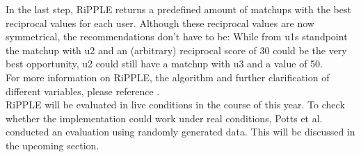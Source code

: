 \documentclass[nochapterpage,bigchapter,linedtoc,longdoc,colorback,accentcolor=tud3b]{tudreport}
\begin{document}
In the last step, RiPPLE returns a predefined amount of matchups with the best reciprocal values for each user. Although these reciprocal values are now symmetrical, the recommendations don't have to be: While from u1s standpoint the matchup with u2 and an (arbitrary) reciprocal score of 30 could be the very best opportunity, u2 could still have a matchup with u3 and a value of 50.\\
For more information on RiPPLE, the algorithm and further clarification of different variables, please reference \cite{potts2018reciprocal}.\\	
RiPPLE will be evaluated in live conditions in the course of this year. To check whether the implementation could work under real conditions, Potts et al. conducted an evaluation using randomly generated data. This will be discussed in the upcoming section.\\
\end{document}
